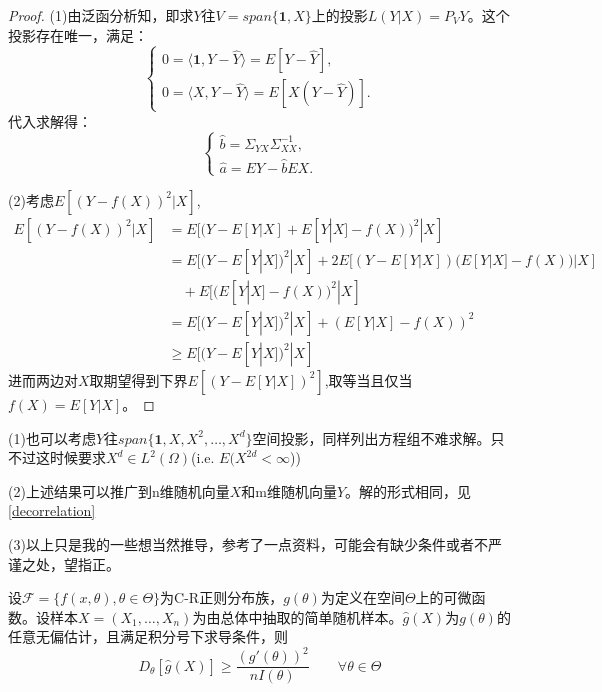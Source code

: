 \documentclass[cn,hazy,green,12pt,normal]{elegantnote}
\newcommand{\MCF}{\mathscr F}
\numberwithin{equation}{section}
\numberwithin{subsection}{section}
\begin{document}
\begin{proof}
    (1)由泛函分析知，即求$Y$往$V=span\{\bm 1,X\}$上的投影$L(Y|X)=P_V Y$。这个投影存在唯一，满足：
 \[\begin{cases}
        0=\langle \bm 1,Y-\hat{Y}\rangle=E[Y-\hat{Y}],\\
        0=\langle X,Y-\hat{Y}\rangle = E[X(Y-\hat{Y})].
    \end{cases}\]
    代入求解得：
     \[\begin{cases}
       \hat{b}=\Sigma_{YX}\Sigma_{XX}^{-1},\\
       \hat{a}=EY-\hat{b}EX.
    \end{cases}\]

    (2)考虑$E[(Y-f(X))^2|X]$,
    \[
\begin{aligned}
    E[(Y-f(X))^2|X]&=E[(Y-E[Y|X]+E[Y|X]-f(X))^2|X]\\    
    &=E[(Y-E[Y|X])^2|X]+2E[(Y-E[Y|X])(E[Y|X]-f(X))|X]\\&\hspace{1em}+E[(E[Y|X]-f(X))^2|X]\\
    &=E[(Y-E[Y|X])^2|X]+(E[Y|X]-f(X))^2\\
    &\ge E[(Y-E[Y|X])^2|X]
\end{aligned}
\]
进而两边对$X$取期望得到下界$E[(Y-E[Y|X])^2]$,取等当且仅当$f(X)=E[Y|X]$。
\end{proof}
\begin{note}
    (1)也可以考虑$Y$往$span\{\bm 1, X, X^2,\dots,X^d\}$空间投影，同样列出方程组不难求解。只不过这时候要求$X^d \in L^2(\Omega)$(i.e. $E(X^{2d}<\infty$))
    
    \noindent (2)上述结果可以推广到n维随机向量$X$和m维随机向量$Y$。解的形式相同，见\ref{decorrelation}

    \noindent (3)以上只是我的一些想当然推导，参考了一点资料，可能会有缺少条件或者不严谨之处，望指正。
\end{note}
\begin{example}
    设$\MCF=\{f(x,\theta),\theta \in \Theta\}$为C-R正则分布族，$g(\theta)$为定义在空间$\Theta$上的可微函数。设样本$X=(X_1, \dots,X_n)$为由总体中抽取的简单随机样本。$\hat{g}(X)$为$g(\theta)$的任意无偏估计，且满足积分号下求导条件，则
    \[
    D_{\theta}[\hat{g}(X)]\ge \dfrac{(g'(\theta ))^2}{nI(\theta)} \qquad \forall \theta \in \Theta
    \]
\end{example}
\end{document}
